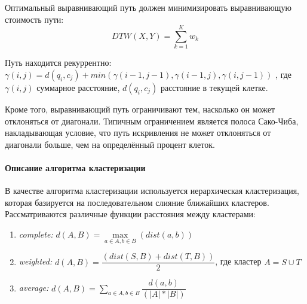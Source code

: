 \documentclass[12pt,twoside]{article}
\begin{document}
        Оптимальный выравнивающий путь должен минимизировать выравнивающую стоимость пути:
            $$
                DTW(X, Y)=\displaystyle\sum\limits_{k=1}^{K} w_k
            $$
            
        Путь находится рекуррентно:\\
            $\gamma(i, j) = d(q_i, c_j) + min({\gamma(i-1, j-1), \gamma(i-1, j), \gamma(i, j-1)})$ ,
            где $\gamma(i, j)$ суммарное расстояние, $d(q_i, c_j)$ расстояние в текущей клетке.
						
                Кроме того, выравнивающий путь ограничивают тем, насколько он может отклоняться от диагонали.
                Типичным ограничением является полоса Сако-Чиба, накладывающая условие, что путь искривления не может отклоняться от диагонали больше,
                чем на определённый процент клеток.

	\paragraph{Описание алгоритма кластеризации}      
        В качестве алгоритма кластеризации используется иерархическая кластеризация, которая базируется на последовательном слияние ближайших кластеров.
        Рассматриваются различные функции расстояния между кластерами: 
        \begin{enumerate}
            \item \textit{complete:}  $d(A, B) = \max\limits_{a \in A, b \in B}(dist(a, b))$ 
            \item \textit{weighted:}  $d(A,B) = \dfrac{(dist(S,B) + dist(T,B))}{2}$, где кластер $A = S \cup T$
            \item \textit{average:}   $d(A,B) = \sum\limits_{a \in A, b \in B} \dfrac{d(a, b)}{(|A|*|B|)}$ 
        \end{enumerate} 



\end{document}
